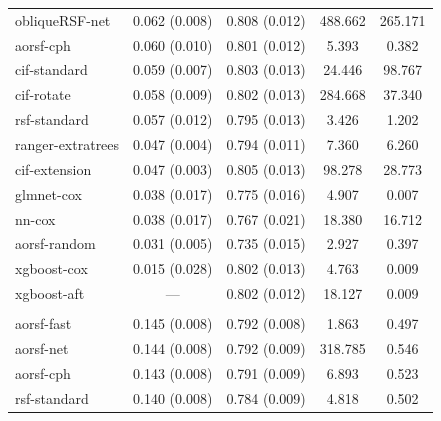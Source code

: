 \documentclass{article}\usepackage[]{graphicx}\usepackage[]{xcolor}
\newenvironment{knitrout}{}{} %
\begin{document}
\begin{knitrout}
\begin{longtable}[t]{lcccc}
\hspace{1em}obliqueRSF-net & 0.062 (0.008) & 0.808 (0.012) & 488.662 & 265.171\\
\hspace{1em}aorsf-cph & 0.060 (0.010) & 0.801 (0.012) & 5.393 & 0.382\\
\hspace{1em}cif-standard & 0.059 (0.007) & 0.803 (0.013) & 24.446 & 98.767\\
\hspace{1em}cif-rotate & 0.058 (0.009) & 0.802 (0.013) & 284.668 & 37.340\\
\hspace{1em}rsf-standard & 0.057 (0.012) & 0.795 (0.013) & 3.426 & 1.202\\
\hspace{1em}ranger-extratrees & 0.047 (0.004) & 0.794 (0.011) & 7.360 & 6.260\\
\hspace{1em}cif-extension & 0.047 (0.003) & 0.805 (0.013) & 98.278 & 28.773\\
\hspace{1em}glmnet-cox & 0.038 (0.017) & 0.775 (0.016) & 4.907 & 0.007\\
\hspace{1em}nn-cox & 0.038 (0.017) & 0.767 (0.021) & 18.380 & 16.712\\
\hspace{1em}aorsf-random & 0.031 (0.005) & 0.735 (0.015) & 2.927 & 0.397\\
\hspace{1em}xgboost-cox & 0.015 (0.028) & 0.802 (0.013) & 4.763 & 0.009\\
\hspace{1em}xgboost-aft & --- & 0.802 (0.012) & 18.127 & 0.009\\
\addlinespace[0.3em]
\multicolumn{5}{l}{\textit{\textbf{MESA; death, n = 6793, p = 48}}}\\
\hline
\hspace{1em}aorsf-fast & 0.145 (0.008) & 0.792 (0.008) & 1.863 & 0.497\\
\hspace{1em}aorsf-net & 0.144 (0.008) & 0.792 (0.009) & 318.785 & 0.546\\
\hspace{1em}aorsf-cph & 0.143 (0.008) & 0.791 (0.009) & 6.893 & 0.523\\
\hspace{1em}rsf-standard & 0.140 (0.008) & 0.784 (0.009) & 4.818 & 0.502\\

\end{longtable}
\end{knitrout}
\end{document}
